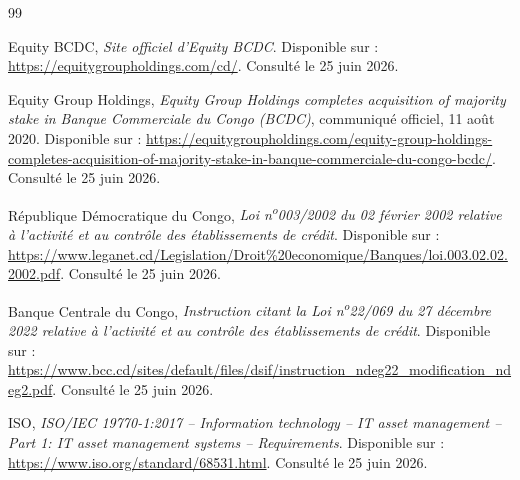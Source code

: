 \documentclass[12pt,a4paper]{report}
\begin{document}
\begin{thebibliography}{99}

Equity BCDC, \textit{Site officiel d'Equity BCDC}. Disponible sur : \url{https://equitygroupholdings.com/cd/}. Consulté le 25 juin 2026.

Equity Group Holdings, \textit{Equity Group Holdings completes acquisition of majority stake in Banque Commerciale du Congo (BCDC)}, communiqué officiel, 11 août 2020. Disponible sur : \url{https://equitygroupholdings.com/equity-group-holdings-completes-acquisition-of-majority-stake-in-banque-commerciale-du-congo-bcdc/}. Consulté le 25 juin 2026.

République Démocratique du Congo, \textit{Loi n\textsuperscript{o}003/2002 du 02 février 2002 relative à l'activité et au contrôle des établissements de crédit}. Disponible sur : \url{https://www.leganet.cd/Legislation/Droit%20economique/Banques/loi.003.02.02.2002.pdf}. Consulté le 25 juin 2026.

Banque Centrale du Congo, \textit{Instruction citant la Loi n\textsuperscript{o}22/069 du 27 décembre 2022 relative à l'activité et au contrôle des établissements de crédit}. Disponible sur : \url{https://www.bcc.cd/sites/default/files/dsif/instruction_ndeg22_modification_ndeg2.pdf}. Consulté le 25 juin 2026.

ISO, \textit{ISO/IEC 19770-1:2017 -- Information technology -- IT asset management -- Part 1: IT asset management systems -- Requirements}. Disponible sur : \url{https://www.iso.org/standard/68531.html}. Consulté le 25 juin 2026.


\end{thebibliography}
\end{document}
